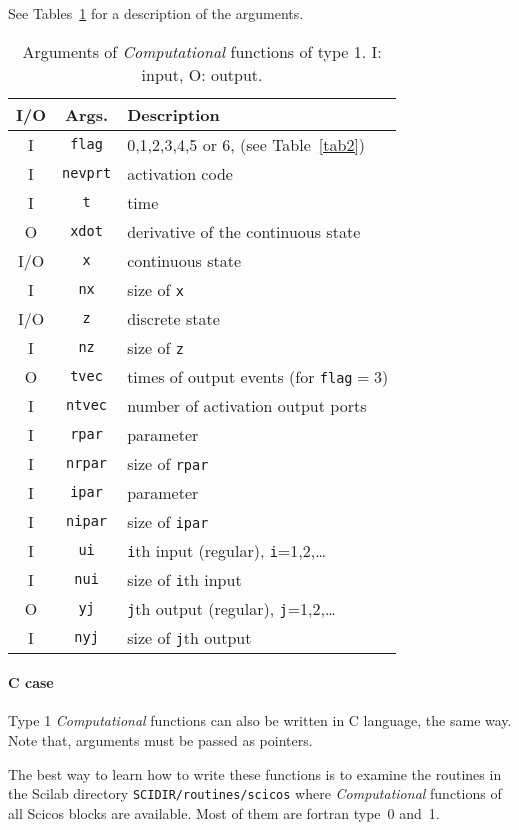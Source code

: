 \documentclass{article}
\newcommand{\computational}{{\em Computational }}
\begin{document}
See Tables~\ref{tab11} for a description of the arguments.
\begin{table}[ht]
\begin{center}
\begin{tabular}{|c|c|l|} \hline
I/O&Args.&Description \\ \hline
I&  {\tt flag}& 0,1,2,3,4,5 or 6,  (see Table~\ref{tab2})\\
I& {\tt nevprt}& activation code  \\
I& {\tt t}& time\\
O& {\tt xdot}& derivative of the continuous state \\
I/O& {\tt x}& continuous state\\
I& {\tt nx}& size of {\tt x}\\
I/O& {\tt z}& discrete state\\
I& {\tt nz}& size of {\tt z}\\
O& {\tt tvec}& times of output events (for {\tt flag}$=$3) \\
I& {\tt ntvec}& number of activation output ports\\
I& {\tt rpar}& parameter\\
I& {\tt nrpar}& size of {\tt rpar}\\
I& {\tt ipar}& parameter\\
I& {\tt nipar}& size of {\tt ipar}\\
I& {\tt ui}& {\tt i}th input (regular), {\tt i}=1,2,\ldots\\
I& {\tt nui} & size of {\tt i}th input \\
O& {\tt yj}& {\tt j}th output (regular), {\tt j}=1,2,\ldots\\
I& {\tt nyj}& size of {\tt j}th output \\ \hline
\end{tabular}
\caption{Arguments of \computational functions of type 1. I: input, O:
output.}
\label{tab11}
\end{center}
\end{table}

\paragraph{C case}
Type 1 \computational functions can also be written in C language,
the same way. Note that, arguments must be passed as pointers.


The best way to learn how to write these functions is to examine the
routines in the Scilab directory 
{\tt SCIDIR/routines/scicos} where \computational functions of all Scicos blocks are available.
Most of them are fortran type~0 and~1.
\end{document}
